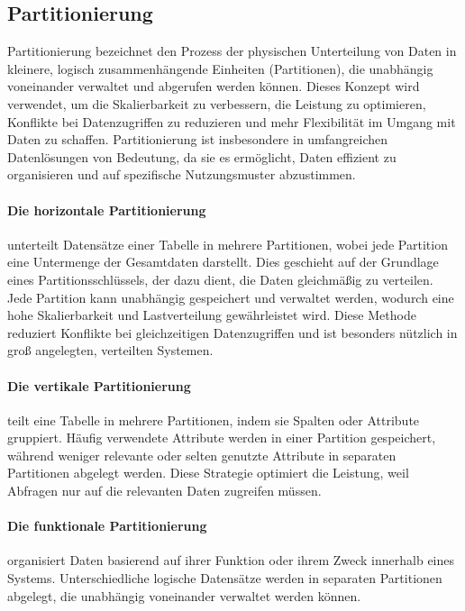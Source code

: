 
\subsection{Partitionierung}

Partitionierung bezeichnet den Prozess der physischen Unterteilung von Daten in kleinere, logisch zusammenhängende
Einheiten (Partitionen), die unabhängig voneinander verwaltet und abgerufen werden können.
Dieses Konzept wird verwendet, um die Skalierbarkeit zu verbessern, die Leistung zu optimieren, Konflikte
bei Datenzugriffen zu reduzieren und mehr Flexibilität im Umgang mit Daten zu schaffen.
Partitionierung ist insbesondere in umfangreichen Datenlösungen von Bedeutung, da sie es ermöglicht,
Daten effizient zu organisieren und auf spezifische Nutzungsmuster abzustimmen.


\paragraph{Die horizontale Partitionierung} unterteilt Datensätze einer Tabelle in mehrere Partitionen, wobei jede Partition eine Untermenge der Gesamtdaten darstellt. Dies geschieht auf der Grundlage eines Partitionsschlüssels, der dazu dient, die Daten gleichmäßig zu verteilen. Jede Partition kann unabhängig gespeichert und verwaltet werden, wodurch eine hohe Skalierbarkeit und Lastverteilung gewährleistet wird. Diese Methode reduziert Konflikte bei gleichzeitigen Datenzugriffen und ist besonders nützlich in groß angelegten, verteilten Systemen.
\paragraph{Die vertikale Partitionierung} teilt eine Tabelle in mehrere Partitionen, indem sie Spalten oder Attribute gruppiert. Häufig verwendete Attribute werden in einer Partition gespeichert, während weniger relevante oder selten genutzte Attribute in separaten Partitionen abgelegt werden. Diese Strategie optimiert die Leistung, weil Abfragen nur auf die relevanten Daten zugreifen müssen.
\paragraph{Die funktionale Partitionierung} organisiert Daten basierend auf ihrer Funktion oder ihrem Zweck innerhalb eines Systems. Unterschiedliche logische Datensätze werden in separaten Partitionen abgelegt, die unabhängig voneinander verwaltet werden können.
